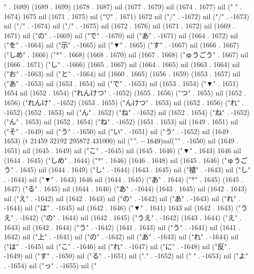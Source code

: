 {" . 1689) (1689 . 1699) (1678 . 1687) nil (1677 . 1679) nil (1674 . 1677) nil (" " . 1674) 1675 nil (1671 . 1675) nil ("▽" . 1671) 1672 nil ("/" . -1672) nil ("/" . -1673) nil ("/" . -1674) nil ("/" . -1675) nil (1672 . 1676) nil (1671 . 1672) nil (1669 . 1671) nil ("の" . -1669) nil ("で" . -1670) nil ("あ" . -1671) nil (1664 . 1672) nil ("を" . -1664) nil ("示" . -1665) nil ("▼" . 1665) ("す" . -1667) nil (1666 . 1667) ("しめ" . 1666) ("*" . 1668) (1668 . 1670) nil (1667 . 1668) ("ゅうごう" . 1667) nil (1666 . 1671) ("し" . -1666) (1665 . 1667) nil (1664 . 1665) nil (1663 . 1664) nil ("お" . -1663) nil ("と" . -1664) nil (1660 . 1665) (1656 . 1659) (1653 . 1657) nil ("あ" . -1653) nil (1653 . 1654) nil ("で" . -1653) nil (1653 . 1654) ("▼" . 1651) 1654 nil (1652 . 1654) ("れんけつ" . -1652) (1655 . 1656) ("つ" . 1655) nil (1652 . 1656) ("れんけ" . -1652) (1653 . 1655) ("んけつ" . 1653) nil (1652 . 1656) ("れ" . -1652) (1652 . 1653) nil ("ん" . 1652) ("ね" . -1652) nil (1652 . 1654) ("ね" . -1652) ("ん" . 1653) nil (1652 . 1654) ("ね" . -1652) (1651 . 1653) nil (1649 . 1651) nil ("そ" . -1649) nil ("う" . -1650) nil ("い" . -1651) nil ("う" . -1652) nil (1649 . 1653) (t 21459 32192 295872 431000) nil ("$" . -1649) nil ("$" . -1650) nil (1649 . 1651) nil (1645 . 1649) nil ("こ" . -1645) nil (1645 . 1646) ("▼" . 1643) 1646 nil (1644 . 1645) ("しめ" . 1644) ("*" . 1646) (1646 . 1648) nil (1645 . 1646) ("ゅうごう" . 1645) nil (1644 . 1649) ("し" . -1644) (1643 . 1645) nil ("褪" . -1643) nil ("し" . -1644) nil ("▼" . 1643) 1646 nil (1644 . 1645) ("あ" . 1644) ("*" . 1645) (1645 . 1647) ("る" . 1645) nil (1644 . 1646) ("あ" . -1644) (1643 . 1645) nil (1642 . 1643) nil ("え" . -1642) nil (1642 . 1643) nil ("の" . -1642) nil ("あ" . -1643) nil ("れ" . -1644) nil ("は" . -1645) nil (1642 . 1646) ("▼" . 1641) 1643 nil (1642 . 1643) ("うえ" . -1642) ("の" . 1644) nil (1642 . 1645) ("うえ" . -1642) (1643 . 1644) ("え" . 1643) nil (1642 . 1644) ("う" . -1642) (1641 . 1643) nil ("う" . -1641) nil (1641 . 1642) nil ("上" . -1641) nil ("の" . -1642) nil ("あ" . -1643) nil ("れ" . -1644) nil ("は" . -1645) nil ("こ" . -1646) nil ("れ" . -1647) nil ("に" . -1648) nil ("反" . -1649) nil ("す" . -1650) nil ("る" . -1651) nil ("." . -1652) nil (" " . -1653) nil ("よ" . -1654) nil ("っ" . -1655) nil ("
}
